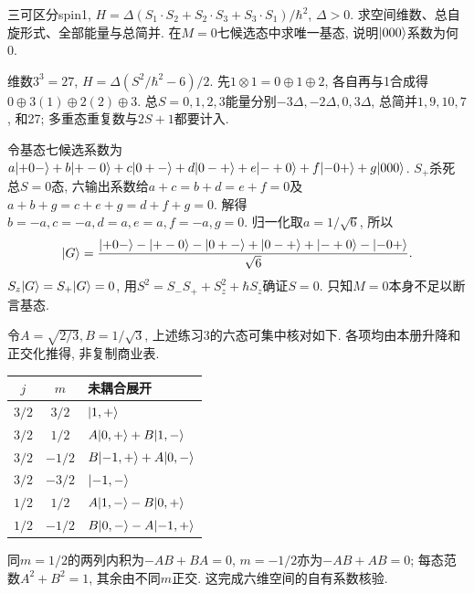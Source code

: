 \begin{exercise}
三可区分spin1, $H=\Delta(S_1\cdot S_2+S_2\cdot S_3+S_3\cdot S_1)/\hbar^2$, $\Delta>0$. 求空间维数、总自旋形式、全部能量与总简并. 在$M=0$七候选态中求唯一基态, 说明$\lvert 000\rangle$系数为何0.
\end{exercise}
\begin{solution}
维数$3^3=27$, $H=\Delta(S^2/\hbar^2-6)/2$. 先$1\otimes1=0\oplus1\oplus2$, 各自再与1合成得$0\oplus3(1)\oplus2(2)\oplus3$. 总$S=0,1,2,3$能量分别$-3\Delta,-2\Delta,0,3\Delta$, 总简并$1,9,10,7$, 和27; 多重态重复数与$2S+1$都要计入.

令基态七候选系数为$a\lvert +0-\rangle+b\lvert +-0\rangle+c\lvert 0+-\rangle+d\lvert 0-+\rangle+e\lvert -+0\rangle+f\lvert -0+\rangle+g\lvert 000\rangle$. $S_+$杀死总$S=0$态, 六输出系数给$a+c=b+d=e+f=0$及$a+b+g=c+e+g=d+f+g=0$. 解得$b=-a,c=-a,d=a,e=a,f=-a,g=0$. 归一化取$a=1/\sqrt6$, 所以
\[
\lvert G\rangle=\frac{\lvert +0-\rangle-\lvert +-0\rangle-\lvert 0+-\rangle+\lvert 0-+\rangle+\lvert -+0\rangle-\lvert -0+\rangle}{\sqrt6}.
\]
$S_z\lvert G\rangle=S_+\lvert G\rangle=0$, 用$S^2=S_-S_++S_z^2+\hbar S_z$确证$S=0$. 只知$M=0$本身不足以断言基态.
\end{solution}

令$A=\sqrt{2/3},B=1/\sqrt3$, 上述练习3的六态可集中核对如下. 各项均由本册升降和正交化推得, 非复制商业表.
\begin{center}\begin{tabular}{ccl}\toprule
$j$&$m$&未耦合展开\\\midrule
$3/2$&$3/2$&$\lvert 1,+\rangle$\\
$3/2$&$1/2$&$A\lvert 0,+\rangle+B\lvert 1,-\rangle$\\
$3/2$&$-1/2$&$B\lvert -1,+\rangle+A\lvert 0,-\rangle$\\
$3/2$&$-3/2$&$\lvert -1,-\rangle$\\
$1/2$&$1/2$&$A\lvert 1,-\rangle-B\lvert 0,+\rangle$\\
$1/2$&$-1/2$&$B\lvert 0,-\rangle-A\lvert -1,+\rangle$\\\bottomrule
\end{tabular}\end{center}
同$m=1/2$的两列内积为$-AB+BA=0$, $m=-1/2$亦为$-AB+AB=0$; 每态范数$A^2+B^2=1$, 其余由不同$m$正交. 这完成六维空间的自有系数核验.

